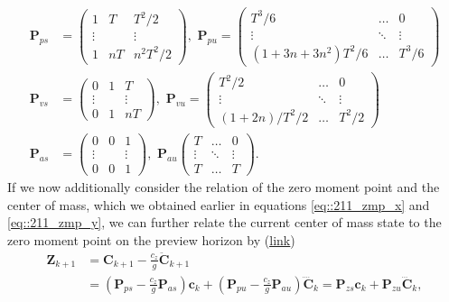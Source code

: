 \begin{align}
	\bm{P}_{ps} &= \begin{pmatrix}
	1 & T & T^2/2 \\
	\vdots & & \vdots \\
	1 & nT & n^2T^2/2
	\end{pmatrix},\,\,
	\bm{P}_{pu} = \begin{pmatrix}
	T^3/6 & \dots & 0 \\
	\vdots & \ddots & \vdots \\
	(1+3n+3n^2)T^2/6 & \dots & T^3/6
	\end{pmatrix} \\
	\bm{P}_{vs} &= \begin{pmatrix}
	0 & 1 & T \\
	\vdots & & \vdots \\
	0 & 1 & nT
	\end{pmatrix},\,\,
	\bm{P}_{vu} = \begin{pmatrix}
	T^2/2 & \dots & 0 \\
	\vdots & \ddots & \vdots \\
	(1+2n)/T^2/2 & \dots & T^2/2
	\end{pmatrix} \\
	\bm{P}_{as} &= \begin{pmatrix}
	0 & 0 & 1 \\
	\vdots  &  & \vdots \\
	 0 & 0 & 1
	\end{pmatrix},\,\,
	\bm{P}_{au}\begin{pmatrix}
	T & \dots & 0 \\
	\vdots & \ddots & \vdots \\
	T & \dots & T
	\end{pmatrix}.
\end{align}
If we now additionally consider the relation of the zero moment point and the center of mass, which we obtained earlier in equations \ref{eq::211_zmp_x} and \ref{eq::211_zmp_y}, we can further relate the current center of mass state to the zero moment point on the preview horizon by (\href{https://github.com/mhubii/nmpc_pattern_generator/blob/5a213044c927dc6aac9f7e32ce1e5fb472cd67bb/libs/pattern_generator/include/pattern_generator/base_generator.h#L219}{\underline{link}})
\begin{align}
	\bm{Z}_{k+1} &= \bm{C}_{k+1} - \frac{c_z}{g}\ddot{\bm{C}}_{k+1} \\
	&= \left(\bm{P}_{ps}-\frac{c_z}{g}\bm{P}_{as}\right)\bm{c}_k + \left(\bm{P}_{pu}-\frac{c_z}{g}\bm{P}_{au}\right)\ddddot{\bm{C}}_k = \bm{P}_{zs} \bm{c}_k + \bm{P}_{zu}\dddot{\bm{C}}_k,
	\label{eq::212_zmp}
\end{align}
